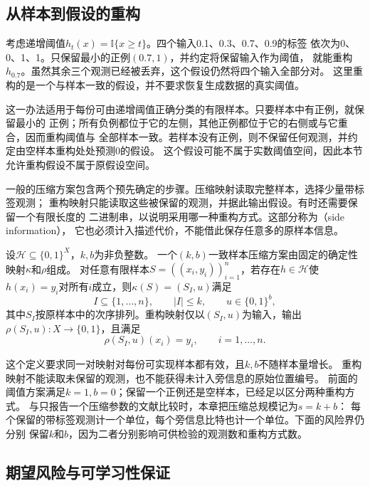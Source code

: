 \subsection{从样本到假设的重构}

考虑递增阈值$h_t(x)=\mathbb I\{x\geq t\}$。四个输入0.1、0.3、0.7、0.9的标签
依次为0、0、1、1。只保留最小的正例$(0.7,1)$，并约定将保留输入作为阈值，
就能重构$h_{0.7}$。虽然其余三个观测已经被丢弃，这个假设仍然将四个输入全部分对。
这里重构的是一个与样本一致的假设，并不要求恢复生成数据的真实阈值。

这一办法适用于每份可由递增阈值正确分类的有限样本。只要样本中有正例，就保留最小的
正例；所有负例都位于它的左侧，其他正例都位于它的右侧或与它重合，因而重构阈值与
全部样本一致。若样本没有正例，则不保留任何观测，并约定由空样本重构处处预测0的假设。
这个假设可能不属于实数阈值空间，因此本节允许重构假设不属于原假设空间。

一般的压缩方案包含两个预先确定的步骤。压缩映射读取完整样本，选择少量带标签观测；
重构映射只能读取这些被保留的观测，并据此输出假设。有时还需要保留一个有限长度的
二进制串，以说明采用哪一种重构方式。这部分称为（side information），
它也必须计入描述代价，不能借此保存任意多的原样本信息。

\begin{definition}[一致样本压缩方案]
\label{def:sample-compression}
设$\mathcal H\subseteq\{0,1\}^X$，$k,b$为非负整数。
一个$(k,b)$一致样本压缩方案由固定的确定性映射$\kappa$和$\rho$组成。
对任意有限样本$S=((x_i,y_i))_{i=1}^n$，若存在$h\in\mathcal H$使
$h(x_i)=y_i$对所有$i$成立，则$\kappa(S)=(S_I,u)$满足
\[
 I\subseteq\{1,\ldots,n\},\qquad |I|\leq k,\qquad u\in\{0,1\}^b,
\]
其中$S_I$按原样本中的次序排列。重构映射仅以$(S_I,u)$为输入，输出
$\rho(S_I,u):X\to\{0,1\}$，且满足
\[
 \rho(S_I,u)(x_i)=y_i,\qquad i=1,\ldots,n.
\]
\end{definition}

这个定义要求同一对映射对每份可实现样本都有效，且$k,b$不随样本量增长。
重构映射不能读取未保留的观测，也不能获得未计入旁信息的原始位置编号。
前面的阈值方案满足$k=1,b=0$；保留一个正例还是空样本，已经足以区分两种重构方式。
与只报告一个压缩参数的文献比较时，本章把压缩总规模记为$s=k+b$：
每个保留的带标签观测计一个单位，每个旁信息比特也计一个单位。下面的风险界仍分别
保留$k$和$b$，因为二者分别影响可供检验的观测数和重构方式数。

\subsection{期望风险与可学习性保证}

